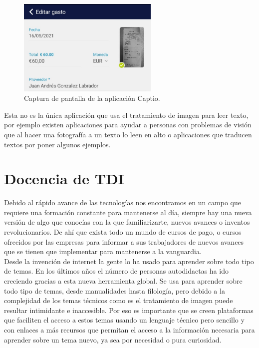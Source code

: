 \begin{itemize}
\begin{figure}[h]
\centering
\includegraphics[width=0.6\textwidth]{imagenes/taxi.PNG}
\caption{Captura de pantalla de la aplicación Captio.}
\label{taxi}
\end{figure}

Esta no es la única aplicación que usa el tratamiento de imagen para leer texto, por ejemplo existen aplicaciones para ayudar a personas con problemas de visión que al hacer una fotografía a un texto lo leen en alto o aplicaciones que traducen textos por poner algunos ejemplos.\\

\end{itemize}

\section{Docencia de TDI}

Debido al rápido avance de las tecnologías nos encontramos en un campo que requiere una formación constante para mantenerse al día, siempre hay una nueva versión de algo que conocías con la que familiarizarte, nuevos avances o inventos revolucionarios. De ahí que exista todo un mundo de cursos de pago, o cursos ofrecidos por las empresas para informar a sus trabajadores de nuevos avances que se tienen que implementar para mantenerse a la vanguardia.\\

Desde la invención de internet la gente lo ha usado para aprender sobre todo tipo de temas\cite{KUO201435}. En los últimos años el número de personas autodidactas ha ido creciendo gracias a esta nueva herramienta global. Se usa para aprender sobre todo tipo de temas, desde manualidades hasta filología, pero debido a la complejidad de los temas técnicos como es el tratamiento de imagen puede resultar intimidante e inaccesible. Por eso es importante que se creen plataformas que faciliten el acceso a estos temas usando un lenguaje técnico pero sencillo y con enlaces a más recursos que permitan el acceso a la información necesaria para aprender sobre un tema nuevo, ya sea por necesidad o pura curiosidad.\\

